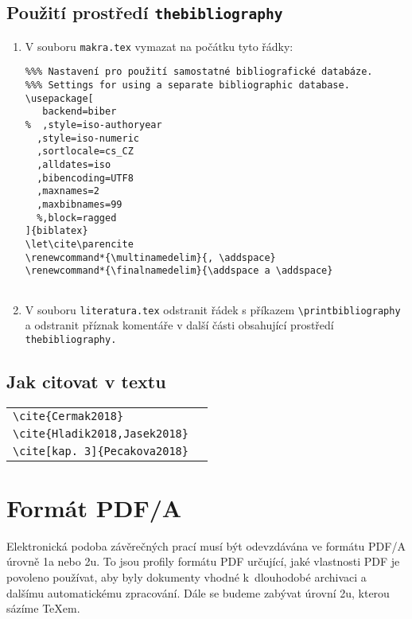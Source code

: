 \section{Použití prostředí \texttt{thebibliography}}
\begin{enumerate}
\item V souboru \texttt{makra.tex} vymazat na počátku tyto řádky:
\begin{verbatim}
%%% Nastavení pro použití samostatné bibliografické databáze.
%%% Settings for using a separate bibliographic database.
\usepackage[
   backend=biber
%  ,style=iso-authoryear
  ,style=iso-numeric
  ,sortlocale=cs_CZ
  ,alldates=iso
  ,bibencoding=UTF8
  ,maxnames=2
  ,maxbibnames=99
  %,block=ragged
]{biblatex}
\let\cite\parencite
\renewcommand*{\multinamedelim}{, \addspace}
\renewcommand*{\finalnamedelim}{\addspace a \addspace}


\end{verbatim}
\item V souboru \texttt{literatura.tex} odstranit řádek s příkazem \verb'\printbibliography' a odstranit příznak komentáře v další části obsahující prostředí \texttt{thebibliography.}
\end{enumerate}


\section{Jak citovat v textu}
\begin{center}
\begin{tabular}{l@{~~$\longrightarrow$~~}l}
\verb|\cite{Cermak2018}|&\cite{Cermak2018}\\
\verb|\cite{Hladik2018,Jasek2018}|&\cite{Hladik2018,Jasek2018}\\
\verb|\cite[kap. 3]{Pecakova2018}|&\cite[kap. 3]{Pecakova2018}\\
\end{tabular}
\end{center}


\chapter{Formát PDF/A}

Elektronická podoba závěrečných
prací musí být odevzdávána ve formátu PDF/A úrovně 1a nebo 2u. To jsou
profily formátu PDF určující, jaké vlastnosti PDF je povoleno používat,
aby byly dokumenty vhodné k~dlouhodobé archivaci a dalšímu automatickému
zpracování. Dále se budeme zabývat úrovní 2u, kterou sázíme \TeX{}em.

